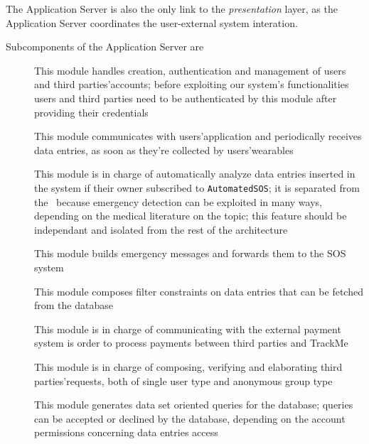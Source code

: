 \documentclass[../DD0.tex]{subfiles}
\begin{document}
        The Application Server is also the only link to the \textit{presentation} layer, as the Application Server  coordinates the user-external system interation.

        Subcomponents of the Application Server are
        \begin{description}
          \item[\AccountManager] This module handles creation, authentication and management of users and third parties'accounts; before exploiting our system's functionalities users and third parties need to be authenticated by this module after providing their credentials
          \item[\DataCollector] This module communicates with users'application and periodically receives data entries, as soon as they're collected by users'wearables
          \item[\EmergencyDetector] This module is in charge of automatically analyze data entries inserted in the system if their owner subscribed to \texttt{AutomatedSOS}; it is separated from the \DataCollector\ because emergency detection can be exploited in many ways, depending on the medical literature on the topic; this feature should be independant and isolated from the rest of the architecture
          \item[\EmergencyDispatcher] This module builds emergency messages and forwards them to the SOS system
          \item[\FilterManager] This module composes filter constraints on data entries that can be fetched from the database
          \item[\PaymentGateway] This module is in charge of communicating with the external payment system is order to process payments between third parties and TrackMe
          \item[\RequestManager] This module is in charge of composing, verifying and elaborating third parties'requests, both of single user type and anonymous group type
          \item[\SetBuilder] This module generates data set oriented queries for the database; queries can be accepted or declined by the database, depending on the account permissions concerning data entries access
        \end{description}
\end{document}
